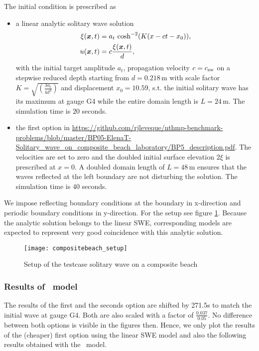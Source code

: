 The initial condition is prescribed as 
\begin{itemize}
 \item a linear analytic solitary wave solution
\begin{align}
\xi(\boldsymbol{x},t)&=a_t \ \text{cosh}^{-2}(K(x-ct-x_0)), \\
u(\boldsymbol{x},t)&=c\frac{\xi(\boldsymbol{x},t)}{d},
\end{align}
with the initial target amplitude $a_t$, propagation velocity $c=c_{\text{sw}}$ on a stepwise reduced depth starting from $d=0.218 \, \text{m}$ with scale factor $K=\sqrt{\left(\frac{3a_t}{4d^3}\right)}$ and displacement $x_0=10.59$, s.t. the initial solitary wave has its maximum at gauge G4 while the entire domain length is $L=24 \, \text{m}$. The simulation time is $20$ seconds. 
 \item the first option in \url{https://github.com/rjleveque/nthmp-benchmark-problems/blob/master/BP05-ElenaT-Solitary_wave_on_composite_beach_laboratory/BP5_description.pdf}. The velocities are set to zero and the doubled initial surface elevation $2\xi$ is prescribed at $x=0$. A doubled domain length of $L=48 \, \text{m}$ ensures that the waves reflected at the left boundary are not disturbing the solution. The simulation time is $40$ seconds.
\end{itemize}
We impose reflecting boundary conditions at the boundary in x-direction and periodic boundary conditions in y-direction. For the setup see figure \ref{fig:compositebeach_setup}. 
Because the analytic solution belongs to the linear SWE, corresponding models are expected to represent very good coincidence with this analytic solution.

\begin{figure}[htbp]
\texttt{[image: compositebeach\_setup]}
\caption{Setup of the testcase solitary wave on a composite beach}
\label{fig:compositebeach_setup}
\end{figure}

\subsubsection{Results of \nh\ model}
The results of the first and the seconds option are shifted by 271.5s to match the initial wave at gauge G4. Both are also scaled with a factor of $\frac{0.037}{0.05}$. %
No difference between both options is visible in the figures then. Hence, we only plot the results of the (cheaper) first option using the linear SWE model and also the following results obtained with the \nh\ model.

